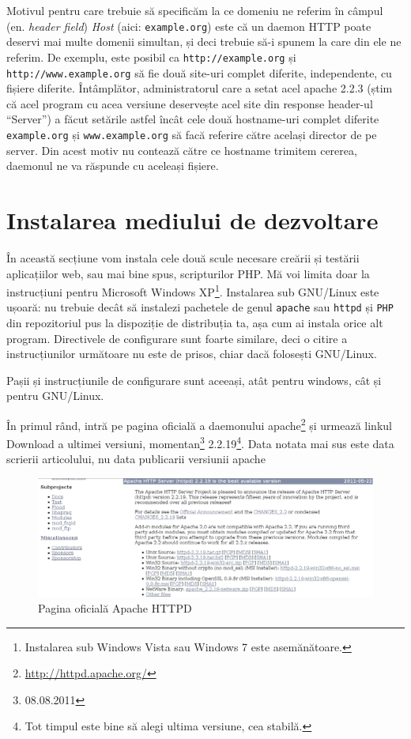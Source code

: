 Motivul pentru care trebuie să specificăm la ce domeniu ne referim în câmpul
(en. \textsl{header field}) \textsl{Host} (aici: \texttt{example.org}) este că un daemon HTTP
poate deservi mai multe domenii simultan, și deci trebuie să-i spunem la care
din ele ne referim.
De exemplu, este posibil ca \texttt{http://example.org} și
\texttt{http://www.example.org} să fie două site-uri complet diferite, independente, cu
fișiere diferite. Întâmplător, administratorul care a setat acel apache 2.2.3 (știm că
acel program cu acea versiune deservește acel site din response header-ul ``Server'') a făcut setările astfel
încât cele două hostname-uri complet diferite \texttt{example.org} și \texttt{www.example.org}
să facă referire către același director de pe server. Din acest motiv nu contează
către ce hostname trimitem cererea, daemonul ne va răspunde cu aceleași fișiere.

\section{Instalarea mediului de dezvoltare}
În această secțiune vom instala cele două scule necesare creării și testării
aplicațiilor web, sau mai bine spus, scripturilor PHP. Mă voi limita doar
la instrucțiuni pentru Microsoft Windows XP\footnote{Instalarea sub Windows Vista sau 
Windows 7 este asemănătoare.}. Instalarea sub GNU/Linux este ușoară: nu trebuie
decât să instalezi pachetele de genul \texttt{apache} sau \texttt{httpd}
și \texttt{PHP} din repozitoriul
pus la dispoziție de distribuția ta, așa cum ai instala orice alt program.
Directivele de configurare sunt foarte similare, deci o citire a instrucțiunilor
următoare nu este de prisos, chiar dacă folosești GNU/Linux.

Pașii și instrucțiunile de configurare sunt aceeași,
atât pentru windows, cât și pentru GNU/Linux.

În primul rând, intră pe pagina oficială a daemonului
apache\footnote{\url{http://httpd.apache.org/}} și urmează linkul
Download a ultimei versiuni, momentan\footnote{08.08.2011} 2.2.19\footnote{Tot
timpul este bine să alegi ultima versiune, cea stabilă.}.
Data notata mai sus este data scrierii articolului, nu data publicarii versiunii apache


\begin{figure}[ht!]
 \centering
   \includegraphics[width=400bp]{cap01/Screenshot.png}
 \caption{Pagina oficială Apache HTTPD}
 \label{fig:httpd homepage}
\end{figure}


